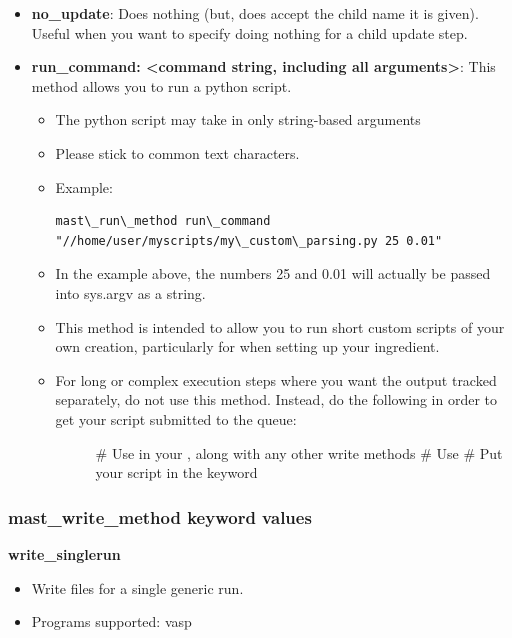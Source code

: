 \documentclass[letterpaper,10pt,english]{sphinxmanual}
\begin{document}
\begin{itemize}
\item {} 
\textbf{no\_update}: Does nothing (but, does accept the child name it is given). Useful when you want to specify doing nothing for a child update step.

\item {} 
\textbf{run\_command: \textless{}command string, including all arguments\textgreater{}}: This method allows you to run a python script.
\begin{itemize}
\item {} 
The python script may take in only string-based arguments

\item {} 
Please stick to common text characters.

\item {} 
Example:

\begin{Verbatim}[commandchars=\\\{\}]
mast\_run\_method run\_command "//home/user/myscripts/my\_custom\_parsing.py 25 0.01"
\end{Verbatim}

\item {} 
In the example above, the numbers 25 and 0.01 will actually be passed into sys.argv as a string.

\item {} 
This method is intended to allow you to run short custom scripts of your own creation, particularly for  when setting up your ingredient.

\item {} \begin{description}
\item[{For long or complex execution steps where you want the output tracked separately, do not use this method. Instead, do the following in order to get your script submitted to the queue:}] \leavevmode
\#  Use  in your , along with any other write methods
\#  Use 
\#  Put your script in the  keyword

\end{description}

\end{itemize}

\end{itemize}


\subsubsection{mast\_write\_method keyword values}
\label{3_1_2_ingredients:mast-write-method-keyword-values}
\textbf{write\_singlerun}
\begin{itemize}
\item {} 
Write files for a single generic run.

\item {} 
Programs supported: vasp

\end{itemize}
\end{document}
